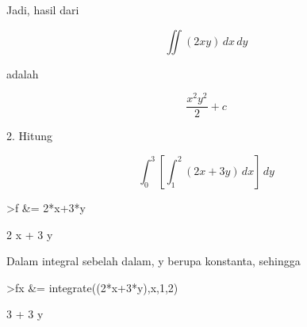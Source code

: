 \documentclass[a4paper,10pt]{article}
\begin{document}
\begin{eulernotebook}
\begin{eulercomment}
\begin{eulercomment}
\begin{eulercomment}
\begin{eulercomment}
\begin{eulercomment}
\begin{eulercomment}
\begin{eulercomment}
\begin{eulercomment}
\begin{eulercomment}
\begin{eulercomment}
\begin{eulercomment}
\begin{eulercomment}
\begin{eulercomment}
\begin{eulercomment}
\begin{eulercomment}
\begin{eulercomment}
\begin{eulercomment}
\begin{eulercomment}
\begin{eulercomment}
\begin{eulercomment}
\begin{eulercomment}
\begin{eulercomment}
\begin{eulercomment}
\begin{eulercomment}
\begin{eulercomment}
\begin{eulercomment}
\begin{eulercomment}
\begin{eulercomment}
\begin{eulercomment}
\begin{eulercomment}
\begin{euleroutput}
\end{euleroutput}
\begin{eulercomment}
Jadi, hasil dari\\
\end{eulercomment}
\begin{eulerformula}
\[
\iint (2xy) \, dx \, dy
\]
\end{eulerformula}
\begin{eulercomment}
adalah\\
\end{eulercomment}
\begin{eulerformula}
\[
\frac{x^2y^2}{2}+c
\]
\end{eulerformula}
\begin{eulercomment}
2. Hitung\\
\end{eulercomment}
\begin{eulerformula}
\[
\int_{0}^{3} \left[ \int_{1}^{2} (2x+3y) \, dx \right] \, dy
\]
\end{eulerformula}
\begin{eulerprompt}
>f &= 2*x+3*y
\end{eulerprompt}
\begin{euleroutput}
  
                                2 x + 3 y
  
\end{euleroutput}
\begin{eulercomment}
Dalam integral sebelah dalam, y berupa konstanta, sehingga
\end{eulercomment}
\begin{eulerprompt}
>fx &= integrate((2*x+3*y),x,1,2)
\end{eulerprompt}
\begin{euleroutput}
  
                                 3 + 3 y
  

\end{euleroutput}
\end{eulercomment}
\end{eulercomment}
\end{eulercomment}
\end{eulercomment}
\end{eulercomment}
\end{eulercomment}
\end{eulercomment}
\end{eulercomment}
\end{eulercomment}
\end{eulercomment}
\end{eulercomment}
\end{eulercomment}
\end{eulercomment}
\end{eulercomment}
\end{eulercomment}
\end{eulercomment}
\end{eulercomment}
\end{eulercomment}
\end{eulercomment}
\end{eulercomment}
\end{eulercomment}
\end{eulercomment}
\end{eulercomment}
\end{eulercomment}
\end{eulercomment}
\end{eulercomment}
\end{eulercomment}
\end{eulercomment}
\end{eulercomment}
\end{eulercomment}
\end{eulernotebook}
\end{document}
